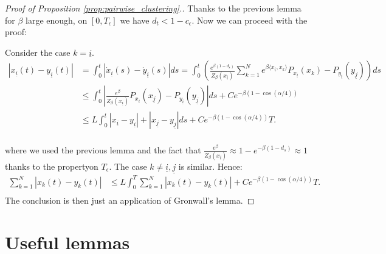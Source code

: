\documentclass{article}
\numberwithin{theorem}{section}
\begin{document}
\begin{proof}[Proof of Proposition \ref{prop:pairwise_clustering}.]
Thanks to the previous lemma for $\beta$ large enough, on $[0,T_\epsilon]$ we have $d_t<1-c_\epsilon$.
Now we can proceed with the proof:

Consider the case $k=\underline{i}$.
\begin{align*}
|x_{\underline{i}}(t) - y_{\underline{i}}(t)| &= \int_0^t |\dot{x}_{\underline{i}}(s) - \dot{y}_{\underline{i}}(s)|ds = \int_0^t \left(\frac{e^{\beta(1-d_s)}}{Z_\beta(x_{\underline{i}})}\sum_{k=1}^N e^{\beta\langle x_{\underline{i}}, x_k\rangle} P_{x_{\underline{i}}}(x_k) - P_{y_{\underline{i}}}(y_{\underline{j}})\right)ds\\
&\leq \int_0^t |\frac{e^{\beta}}{Z_\beta(x_{\underline{i}})}P_{x_{\underline{i}}}(x_{\underline{j}}) -P_{y_{\underline{i}}}(y_{\underline{j}})|ds + Ce^{-\beta(1-\cos(\alpha/4))}\\
&\leq L\int_0^t |x_{\underline{i}}-y_{\underline{i}}|+ |x_{\underline{j}}-y_{\underline{j}}|ds + Ce^{-\beta(1-\cos(\alpha/4))}T.\\
\end{align*}

where we used the previous lemma and the fact that $\frac{e^\beta}{Z_\beta(x_{\underline{i}})}\approx 1-e^{-\beta(1-d_s)}\approx 1$ thanks to the propertyon $T_\epsilon$. The case $k\neq\underline{i}, \underline{j}$ is similar. Hence:
\begin{align*}
\sum_{k=1}^N |x_{k}(t) - y_{k}(t)| &\leq L\int_0^T  \sum_{k=1}^N |x_{k}(t) - y_{k}(t)| + Ce^{-\beta(1-\cos(\alpha/4))}T.\\
\end{align*}
The conclusion is then just an application of Gronwall's lemma.
\end{proof}
\section{Useful lemmas}
\end{document}

